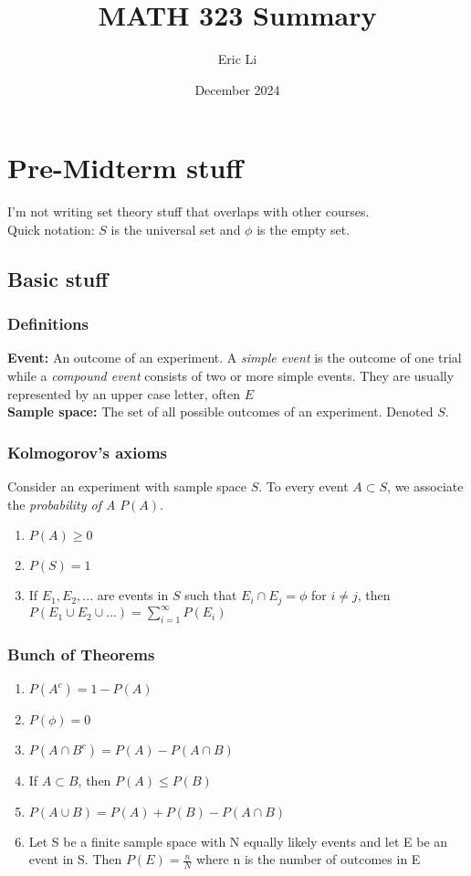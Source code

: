 \documentclass{article}
\title{MATH 323 Summary}
\author{Eric Li}
\date{December 2024}
\begin{document}
\maketitle

\section{Pre-Midterm stuff}
I'm not writing set theory stuff that overlaps with other courses.\\
Quick notation: $S$ is the universal set and $\phi$ is the empty set.
\subsection{Basic stuff}
\subsubsection{Definitions}%
\textbf{Event:} An outcome of an experiment. A\textit{ simple event} is the outcome of one trial while a \textit{compound event} consists of two or more simple events. They are usually represented by an upper case letter, often $E$\\
\textbf{Sample space: } The set of all possible outcomes of an experiment. Denoted $S$.
\subsubsection{Kolmogorov's axioms}
Consider an experiment with sample space $S$. To every event $A\subset S$, we associate the \textit{probability of A} $P(A)$.
\begin{enumerate}
    \item $P(A) \geq 0$
    \item $P(S) = 1$
    \item If $E_1,E_2,...$ are events in $S$ such that $E_i \cap E_j =  \phi$ for $i\ne j$, then $P(E_1\cup E_2\cup...)=\sum^{\infty}_{i=1} P(E_i)$
\end{enumerate}
\subsubsection{Bunch of Theorems}
\begin{enumerate}
    \item $P(A^c) = 1-P(A)$
    \item $P(\phi) = 0$
    \item $P(A\cap B^c)=P(A)-P(A\cap B)$
    \item If $A\subset B$, then $P(A)\le P(B)$
    \item $P(A\cup B) = P(A)+P(B)-P(A\cap B)$
    \item Let S be a finite sample space with N equally likely events and let E be an event in S. Then $P(E) = \frac{n}{N}$ where n is the number of outcomes in E
\end{enumerate}
\end{document}
